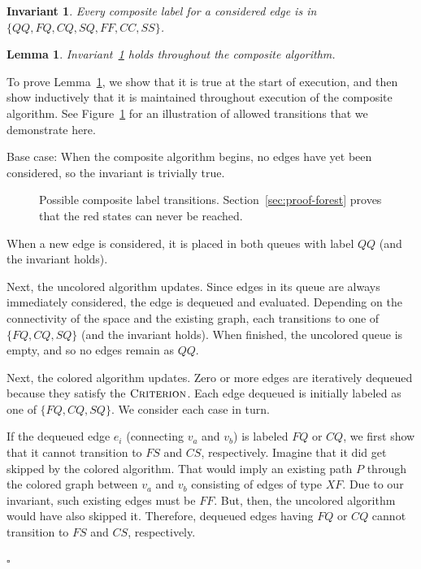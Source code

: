 \documentclass{report}
\newtheorem{invariant}{Invariant}
\newtheorem{lemma}{Lemma}
\newenvironment{proof}[1][Proof]{\begin{trivlist}
   \item[\hskip \labelsep {\bfseries #1}]}{\hfill$\square$\end{trivlist}}
\begin{document}
\vspace{0.05in}

\begin{invariant}
Every composite label for a considered edge is in
$\{ QQ, FQ, CQ, SQ, FF, CC, SS \}$.
\label{inv:pairwise-labels}
\end{invariant}

\vspace{0.05in}

\begin{lemma}
Invariant~\ref{inv:pairwise-labels} holds throughout the composite
algorithm.
\label{lem:pairwise-labels}
\end{lemma}

\begin{proof}
To prove Lemma~\ref{lem:pairwise-labels},
we show that it is true at the start of execution,
and then show inductively that it is maintained throughout execution
of the composite algorithm.
See Figure~\ref{fig:pairwise-labels} for an illustration of allowed
transitions that we demonstrate here.

Base case: When the composite algorithm begins,
no edges have yet been considered,
so the invariant is trivially true.

\begin{figure}
\centering

\caption{Possible composite label transitions.
   Section~\ref{sec:proof-forest} proves that the red states
   can never be reached.}
\label{fig:pairwise-labels}
\end{figure}

When a new edge is considered,
it is placed in both queues with label $QQ$
(and the invariant holds).

Next, the uncolored algorithm updates.
Since edges in its queue are always immediately considered,
the edge is dequeued and evaluated.
Depending on the connectivity of the space and the existing graph,
each transitions to one of $\{ FQ, CQ, SQ \}$ (and the invariant holds).
When finished, the uncolored queue is empty,
and so no edges remain as $QQ$.

Next, the colored algorithm updates.
Zero or more edges are iteratively dequeued
because they satisfy the $\textsc{Criterion}$.
Each edge dequeued is initially labeled as one of $\{ FQ, CQ, SQ \}$.
We consider each case in turn.

If the dequeued edge $e_i$ (connecting $v_a$ and $v_b$)
is labeled $FQ$ or $CQ$,
we first show that it cannot transition to $FS$ and $CS$, respectively.
Imagine that it did get skipped by the colored algorithm.
That would imply an existing path $P$ through the colored graph
between $v_a$ and $v_b$ consisting of edges of type $XF$.
Due to our invariant, such existing edges must be $FF$.
But, then, the uncolored algorithm would have also skipped it.
Therefore, dequeued edges having $FQ$ or $CQ$ cannot transition to
$FS$ and $CS$, respectively.


\end{proof}
\end{document}
